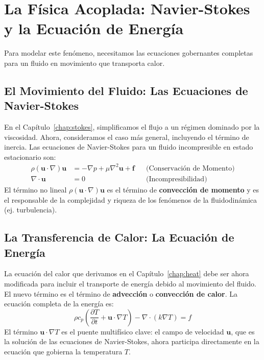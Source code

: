 \section{La Física Acoplada: Navier-Stokes y la Ecuación de Energía}
\label{sec:convection-theory}
Para modelar este fenómeno, necesitamos las ecuaciones gobernantes completas para un fluido en movimiento que transporta calor.

\subsection{El Movimiento del Fluido: Las Ecuaciones de Navier-Stokes}
En el Capítulo~\ref{chap:stokes}, simplificamos el flujo a un régimen dominado por la viscosidad. Ahora, consideramos el caso más general, incluyendo el término de inercia. Las ecuaciones de Navier-Stokes para un fluido incompresible en estado estacionario son:
\begin{align}
    \rho(\bm{u} \cdot \nabla)\bm{u} &= -\nabla p + \mu \nabla^2\bm{u} + \bm{f} && \text{(Conservación de Momento)} \label{eq:ns-momentum} \\
    \nabla \cdot \bm{u} &= 0 && \text{(Incompresibilidad)} \label{eq:ns-continuity}
\end{align}
El término no lineal \(\rho(\bm{u} \cdot \nabla)\bm{u}\) es el término de \textbf{convección de momento} y es el responsable de la complejidad y riqueza de los fenómenos de la fluidodinámica (ej. turbulencia).

\subsection{La Transferencia de Calor: La Ecuación de Energía}
La ecuación del calor que derivamos en el Capítulo~\ref{chap:heat} debe ser ahora modificada para incluir el transporte de energía debido al movimiento del fluido. El nuevo término es el término de \textbf{advección} o \textbf{convección de calor}. La ecuación completa de la energía es:
\begin{equation}
    \rho c_p \left( \frac{\partial T}{\partial t} + \bm{u} \cdot \nabla T \right) - \nabla \cdot (k \nabla T) = f
    \label{eq:energy-equation}
\end{equation}
El término \(\bm{u} \cdot \nabla T\) es el puente multifísico clave: el campo de velocidad \(\bm{u}\), que es la solución de las ecuaciones de Navier-Stokes, ahora participa directamente en la ecuación que gobierna la temperatura \(T\).

